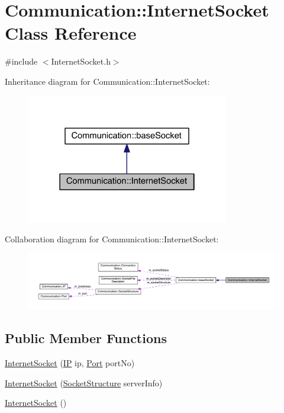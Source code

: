 \hypertarget{class_communication_1_1_internet_socket}{}\section{Communication\+:\+:Internet\+Socket Class Reference}
\label{class_communication_1_1_internet_socket}


{\ttfamily \#include $<$Internet\+Socket.\+h$>$}



Inheritance diagram for Communication\+:\+:Internet\+Socket\+:\nopagebreak
\begin{figure}[H]
\begin{center}
\leavevmode
\includegraphics[width=250pt]{class_communication_1_1_internet_socket__inherit__graph}
\end{center}
\end{figure}


Collaboration diagram for Communication\+:\+:Internet\+Socket\+:\nopagebreak
\begin{figure}[H]
\begin{center}
\leavevmode
\includegraphics[width=350pt]{class_communication_1_1_internet_socket__coll__graph}
\end{center}
\end{figure}
\subsection*{Public Member Functions}
\begin{DoxyCompactItemize}
\item 
\hyperlink{class_communication_1_1_internet_socket_ab14f85e6bcd48942dd4e8e35d953a5cb}{Internet\+Socket} (\hyperlink{class_communication_1_1_i_p}{I\+P} ip, \hyperlink{class_communication_1_1_port}{Port} port\+No)
\item 
\hyperlink{class_communication_1_1_internet_socket_a2f9c89a61795ec80335a1b7f21832b87}{Internet\+Socket} (\hyperlink{class_communication_1_1_socket_structure}{Socket\+Structure} server\+Info)
\item 
\hyperlink{class_communication_1_1_internet_socket_a01a1a3e58b3a6418f40ad061aa455a9f}{Internet\+Socket} ()
\end{DoxyCompactItemize}


